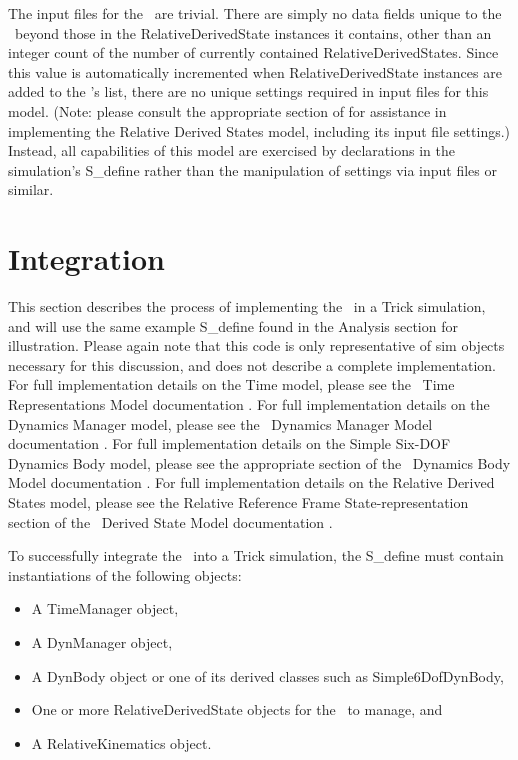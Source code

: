 The input files for the \relkinDesc\ are trivial. There are simply no data
fields unique to the \relkinDesc\ beyond those in the RelativeDerivedState
instances it contains, other than an integer count of the number of currently
contained RelativeDerivedStates. Since this value is automatically incremented
when RelativeDerivedState instances are added to the \relkinDesc's list, there
are no unique settings required in input files for this model. (Note: please
consult the appropriate section of \cite{dynenv:DERIVEDSTATE} for assistance in
implementing the Relative Derived States model, including its input file
settings.) Instead, all capabilities of this model are exercised by declarations
in the simulation's S\_define rather than the manipulation of settings via input
files or similar.


\section{Integration}

This section describes the process of implementing the \relkinDesc\ in a Trick
simulation, and will use the same example S\_define found in the Analysis
section for illustration. Please again note that this code is only
representative of sim objects necessary for this discussion, and does not
describe a complete implementation. For full implementation details on the Time
model, please see the \JEODid\ Time Representations Model documentation
\cite{dynenv:TIME}. For full implementation details on the Dynamics Manager
model, please see the \JEODid\ Dynamics Manager Model documentation
\cite{dynenv:DYNMANAGER}. For full implementation details on the Simple
Six-DOF Dynamics Body model, please see the appropriate section of the \JEODid\
Dynamics Body Model documentation \cite{dynenv:DYNBODY}. For full
implementation details on the Relative Derived States model, please see the
Relative Reference Frame State-representation section of the
\JEODid\ Derived State Model documentation \cite{dynenv:DERIVEDSTATE}.

To successfully integrate the \relkinDesc\ into a Trick simulation, the
S\_define must contain instantiations of the following objects:
\begin{itemize}
\item A TimeManager object,
\item A DynManager object,
\item A DynBody object or one of its derived classes such as Simple6DofDynBody,
\item One or more RelativeDerivedState objects for the \relkinDesc\
to manage, and
\item A RelativeKinematics object.
\end{itemize}

